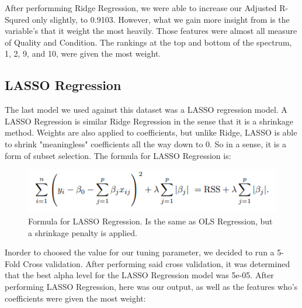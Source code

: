 \documentclass{article}
\begin{document}
	After performming Ridge Regression, we were able to increase our Adjusted R-Squred only slightly, to 0.9103. However, what we gain more insight from is the variable's that it weight the most heavily. Those features were almost all measure of Quality and Condition. The rankings at the top and bottom of the spectrum, 1, 2, 9, and 10, were given the most weight. 

	\subsection{LASSO Regression}

	The last model we used against this dataset was a LASSO regression model. A LASSO Regression is similar Ridge Regression in the sense that it is a shrinkage method. Weights are also applied to coefficients, but unlike Ridge, LASSO is able to shrink "meaningless" coefficients all the way down to 0. So in a sense, it is a form of subset selection. The formula for LASSO Regression is:

	\begin{figure}
		\includegraphics[width=\textwidth]{lassoform}
		\caption{Formula for LASSO Regression. Is the same as OLS Regression, but a shrinkage penalty is applied.}
		\label{fig:skew}
	\end{figure}

	Inorder to choosed the value for our tuning parameter, we decided to run a 5-Fold Cross validation. After performing said cross validation, it was determined that the best alpha level for the LASSO Regression model was 5e-05. After performing LASSO Regression, here was our output, as well as the features who's coefficients were given the most weight:

\end{document}
